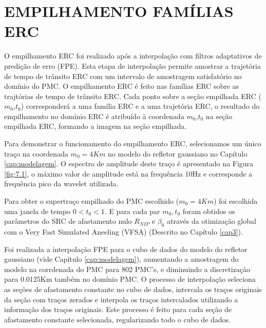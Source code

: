 %
% 
% 
% 
% 
% 
% 

\chapter{EMPILHAMENTO FAMÍLIAS ERC}
\label{cap:empilhamento}

O empilhamento ERC foi realizado após a interpolação com filtros adaptativos de predição de erro (FPE). Esta etapa de
interpolação permite amostrar a trajetória de tempo de trânsito ERC com um intervalo de amostragem satisfatório no
domínio do PMC. O empilhamento ERC é feito nas famílias ERC sobre as trajtórias de tempo de trânsito ERC. Cada ponto sobre
a seção empilhada ERC ($m_0$,$t_0$) corresponderá a uma família ERC e a uma trajetória ERC, 
o resultado do empilhamento no domínio
ERC é atribuído à coordenada $m_0$,$t_0$ na seção empilhada ERC, formando a imagem na seção empilhada.

Para demonstrar o funcionamento do empilhamento ERC, selecionamos um único traço na coordenada $m_0=4Km$ no modelo do refletor
gaussiano no Capítulo \ref{cap:modelagem}. O espectro de amplitude deste traço é apresentado na Figura \ref{fig:7.1}, o máximo valor de amplitude 
está na frequência 10Hz e corresponde a frequência pico da wavelet utilizada.

Para obter o supertraço empilhado do PMC escolhido ($m_0=4Km$) foi escolhida uma janela de tempo $0<t_0<1$.
E para cada par $m_0, t_0$ foram obtidos os parâmetros do SRC de afastamento nulo $R_{NIP}$ e $\beta_0$ 
através da otimização global com o Very Fast Simulated Aneeling (VFSA) (Descrito no Capítulo \ref{cap3}).

Foi realizada a interpolação FPE para o cubo de dados do modelo do refletor gaussiano (vide Capítulo \ref{cap:modelagem}),
aumentando a amostragem
do modelo na corrdenada do PMC para 802 PMC's, e diminuindo a discretização para 0.0125Km também no domínio PMC. O processo 
de interpolação seleciona as seções de afastamento constante no cubo de dados, intercala os traços originais da seção com traços 
zerados e interpola os traços intercalados utilizando a informação dos traços originais. Este processo é feito para cada seção
de afastamento constante selecionada, regularizando todo o cubo de dados.

